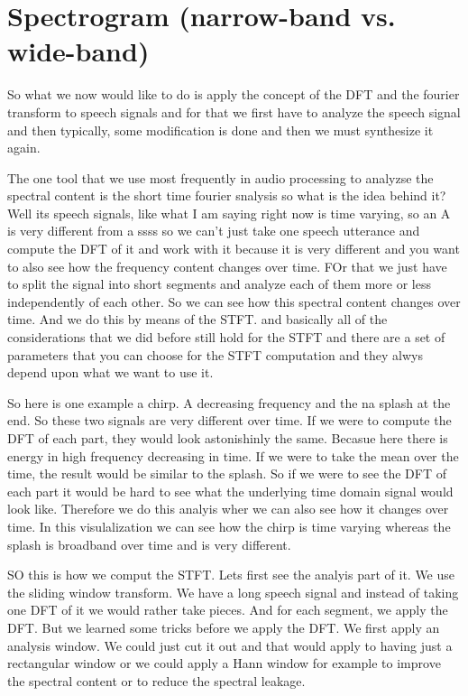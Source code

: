 \clearpage
\section{Spectrogram (narrow-band vs. wide-band)}
\label{Spectrogram (narrow-band vs. wide-band)}

 So what we now would like to do is apply the concept of the DFT and the fourier transform to speech signals and for that we first have to analyze the speech signal and then typically, some modification is done and then we must synthesize it again.
 
 The one tool that we use most frequently in audio processing to analyzse the spectral content is the short time fourier snalysis so what is the idea behind it?  Well its speech signals, like what I am saying right now is time varying, so an A is very different from  a ssss so we can't just take one speech utterance and compute the DFT of it and work with it because it is very different and you want to also see how the frequency content changes over time. FOr that we just have to split the signal into short segments and analyze each of them more or less independently of each other. So we can see how this spectral content changes over time. And we do this by means of the STFT. and basically all of the considerations that we did before still hold for the STFT and there are a set of parameters that you can choose for the STFT computation and they alwys depend upon what we want to use it. 
 
 So here is one example a chirp. A decreasing frequency and the na splash at the end. So these two signals are very different over time. If we were to compute the DFT of each part, they would look astonishinly the same.  Becasue here there is energy in high frequency decreasing in time.  If we were to take the mean over the time, the result would be similar to the splash.  So if we were to see the DFT of each part it would be hard to see what the underlying time domain signal would look like.  Therefore we do this analyis wher we can also see how it changes over time.  In this visulalization we can see how the chirp is time varying whereas the splash is broadband over time and is very different. 
 
 SO this is how we comput the STFT. Lets first see the analyis part of it. We use the sliding window transform.  We have a long speech signal and instead of taking one DFT of it we would rather take pieces. And for each segment, we apply the DFT.  But we learned some tricks before we apply the DFT.  We first apply an analysis window.  We could just cut it out and that would apply to having just a rectangular window or we could apply a Hann window for example to improve the spectral content or to reduce the spectral leakage.
 
